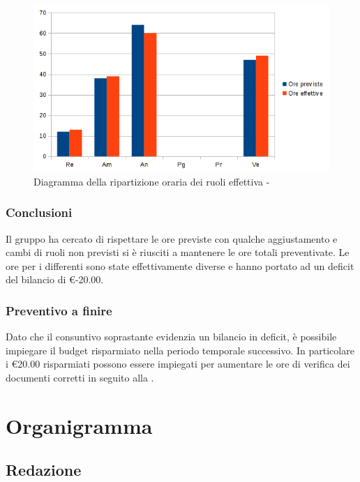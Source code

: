 \documentclass[12pt,a4paper]{article}
\begin{document}
\begin{center}
	\begin{figure}[H]
		\centering
		\includegraphics[width=\textwidth]{../img/diagrammaBarreAnalisiConsuntivo.png}
		\caption{Diagramma della ripartizione oraria dei ruoli effettiva - \FA{}}
	\end{figure}
\end{center}

\subsubsection{Conclusioni}
Il gruppo ha cercato di rispettare le ore previste con qualche aggiustamento e cambi di ruoli non previsti si è riusciti a mantenere le ore totali preventivate. Le ore per i differenti  sono state effettivamente diverse e hanno portato ad un deficit del bilancio di \euro{}-20.00.

\subsubsection{Preventivo a finire}
\label{sec:paf-analisi}
Dato che il consuntivo soprastante evidenzia un bilancio in deficit, è possibile impiegare il budget risparmiato
nella periodo temporale successivo. In particolare i \euro{}20.00 risparmiati possono essere impiegati per aumentare
le ore di verifica dei documenti corretti in seguito alla \RR{}.


\newpage
\appendix
\section{Organigramma}

\subsection{Redazione}
\end{document}

